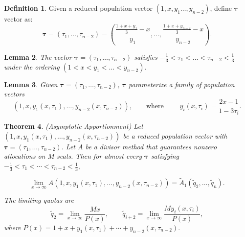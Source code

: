 \documentclass[11pt]{article}
\newtheorem{theorem}{Theorem}[section]
\newtheorem{lemma}[theorem]{Lemma}
\theoremstyle{definition}
\newtheorem{definition}[theorem]{Definition}
\theoremstyle{definition}
\begin{document}
\begin{definition} 
Given a reduced population vector $(1,x, y_1 \dots, y_{n-2})$, define $\bm{\tau}$ vector as:
\[ \bm{\tau} = (\tau_1, \dots, \tau_{n-2}) = \left( \frac{\frac{1+x+y_1}{3}-x }{y_1}, \dots, \frac{\frac{1+x+y_{n-2}}{3}-x }{y_{n-2}} \right).  \]
\end{definition}
\begin{lemma}
The vector $\bm{\tau} = (\tau_1, \dots, \tau_{n-2})$ satisfies $-\frac{1}{3}<\tau_1 < \dots < \tau_{n-2} < \frac{1}{3}$ under the ordering $(1 < x < y_1 < \ldots < y_{n-2})$.
\end{lemma}
\begin{lemma}
    Given $\bm{\tau} = (\tau_1, \dots, \tau_{n-2})$, $\bm{\tau}$ parameterize a family of population vectors 
    \[(1,x,y_1(x, \tau_1), \dots, y_{n-2}(x,\tau_{n-2})), \qquad \text{where } \qquad y_i(x,\tau_i) = \frac{2x-1}{1-3\tau_i}. \]
\end{lemma}
\begin{theorem}\label{lim_1_nstates}
(Asymptotic Apportionment) Let $(1,x,y_1(x,\tau_1),\ldots,y_{n-2}(x,\tau_{n-2}))$ be a reduced population vector with $\bm\tau=(\tau_1,\ldots,\tau_{n-2})$. Let $A$ be a divisor method that guarantees nonzero allocations on $M$ seats. Then for almost every $\bm\tau$ satisfying $-\tfrac13 < \tau_1 < \cdots < \tau_{n-2} < \tfrac13,$

$$\lim_{x\to\infty}A(1,x,y_1(x,\tau_1),\dots,y_{n-2}(x,\tau_{n-2}))=\tilde A_1(\tilde q_2,\dots,\tilde q_n).$$

The limiting quotas are 
$$\tilde q_2=\lim_{x\to\infty}\frac{Mx}{P(x)},\qquad\tilde q_{i+2}
=\lim_{x\to\infty}\frac{M y_i(x,\tau_i)}{P(x)},$$
where $P(x) = 1+x+y_1(x,\tau_1)+\cdots+y_{n-2}(x,\tau_{n-2}).$
\end{theorem}
\end{document}
